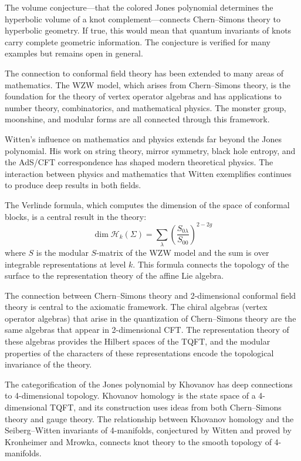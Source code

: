 The volume conjecture---that the colored Jones polynomial determines the hyperbolic volume of a knot complement---connects Chern--Simons theory to hyperbolic geometry. If true, this would mean that quantum invariants of knots carry complete geometric information. The conjecture is verified for many examples but remains open in general.

The connection to conformal field theory has been extended to many areas of mathematics. The WZW model, which arises from Chern--Simons theory, is the foundation for the theory of vertex operator algebras and has applications to number theory, combinatorics, and mathematical physics. The monster group, moonshine, and modular forms are all connected through this framework.

Witten's influence on mathematics and physics extends far beyond the Jones polynomial. His work on string theory, mirror symmetry, black hole entropy, and the AdS/CFT correspondence has shaped modern theoretical physics. The interaction between physics and mathematics that Witten exemplifies continues to produce deep results in both fields.

The Verlinde formula, which computes the dimension of the space of conformal blocks, is a central result in the theory:
\[
\dim \mathcal{H}_k(\Sigma) = \sum_{\lambda} \left( \frac{S_{0\lambda}}{S_{00}} \right)^{2-2g}
\]
where $S$ is the modular $S$-matrix of the WZW model and the sum is over integrable representations at level $k$. This formula connects the topology of the surface to the representation theory of the affine Lie algebra.

The connection between Chern--Simons theory and 2-dimensional conformal field theory is central to the axiomatic framework. The chiral algebras (vertex operator algebras) that arise in the quantization of Chern--Simons theory are the same algebras that appear in 2-dimensional CFT. The representation theory of these algebras provides the Hilbert spaces of the TQFT, and the modular properties of the characters of these representations encode the topological invariance of the theory.

The categorification of the Jones polynomial by Khovanov has deep connections to 4-dimensional topology. Khovanov homology is the state space of a 4-dimensional TQFT, and its construction uses ideas from both Chern--Simons theory and gauge theory. The relationship between Khovanov homology and the Seiberg--Witten invariants of 4-manifolds, conjectured by Witten and proved by Kronheimer and Mrowka, connects knot theory to the smooth topology of 4-manifolds.


